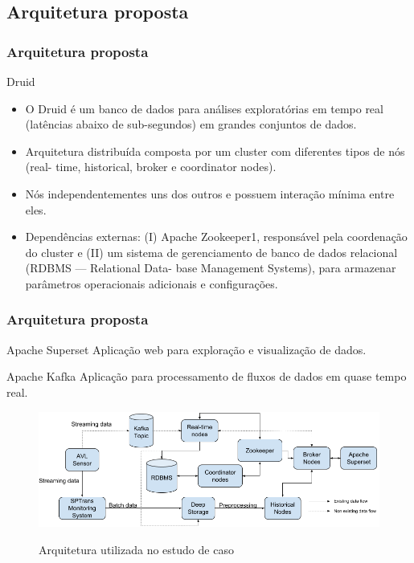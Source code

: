 \documentclass{beamer}
\begin{document}
\subsection{Arquitetura proposta}
\begin{frame}
\frametitle{Arquitetura proposta}
\begin{block}{Druid}
\begin{itemize}
    \item O Druid é um banco de dados para análises exploratórias em tempo real (latências abaixo de sub-segundos) em grandes conjuntos de dados.
    \item Arquitetura distribuída composta por um cluster com diferentes tipos de nós (real- time, historical, broker e coordinator nodes).
    \item Nós independentementes uns dos outros e possuem interação mínima entre eles. 
    \item Dependências externas: (I) Apache Zookeeper1, responsável pela coordenação do cluster e (II) um sistema de gerenciamento de banco de dados relacional (RDBMS — Relational Data- base Management Systems), para armazenar parâmetros operacionais adicionais e configurações.
\end{itemize}
\end{block}
\end{frame}
\begin{frame}
\frametitle{Arquitetura proposta}
\begin{block}{Apache Superset}
Aplicação web para exploração e visualização de dados.
\end{block}
\begin{block}{Apache Kafka}
Aplicação para processamento de fluxos de dados em quase tempo real.
\end{block}
\begin{figure}[!htb]%
	\centering
 	  \caption{Arquitetura utilizada no estudo de caso}
		\includegraphics[width=0.9\linewidth]{viz_arch_en.png}
	\label{fig:viz_arch}
\end{figure}
\end{frame}
\end{document}
